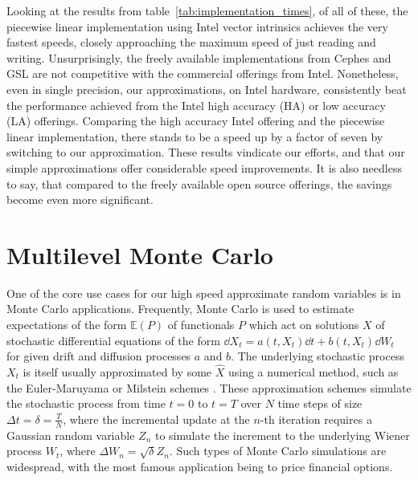 \documentclass[9pt,a4paper,english]{extarticle}
\begin{document}
Looking at the results from table~\ref{tab:implementation_times}, of all of these, the piecewise linear implementation using Intel vector intrinsics achieves the very fastest speeds, closely approaching the maximum speed of just reading and writing. Unsurprisingly, the freely available implementations from Cephes and GSL are not competitive with the commercial offerings from Intel. Nonetheless, even in single precision, our approximations, on Intel hardware, consistently beat the performance achieved from the Intel high accuracy (HA) or low accuracy (LA) offerings. Comparing the high accuracy Intel offering and the piecewise linear implementation, there stands to be a speed up by a factor of seven by switching to our approximation. These results vindicate our efforts, and that our simple approximations offer considerable speed improvements. It is also needless to say, that compared to the freely available open source offerings, the savings become even more significant. 

\section{Multilevel Monte Carlo}
\label{sec:multilevel_monte_carlo}

One of the core use cases for our high speed approximate random variables is in Monte Carlo applications. Frequently, Monte Carlo is used to estimate expectations of the form $ \mathbb{E}(P) $ of functionals $ P $ which act on solutions $ X $ of stochastic differential equations of the form $ \dd{X_t} = a(t, X_t) \dd{t} + b(t, X_t)\dd{W_t} $ for given drift and diffusion processes $ a $ and $ b $. The underlying stochastic process $ X_t $ is itself usually approximated by some $ \widehat{X} $ using a numerical method, such as the Euler-Maruyama or Milstein schemes \citep{asmussen2007stochastic,kloeden1999numerical,lord2014introduction}. These approximation schemes simulate the stochastic process from time $ t = 0 $ to $ t = T $ over $ N $ time steps of size $ \Delta t = \delta = \tfrac{T}{N} $, where the incremental update at the $ n $-th iteration requires a Gaussian random variable $ Z_n $ to simulate the increment to the underlying Wiener process $ W_t $, where $ \Delta W_n = \sqrt{\delta}Z_n $. Such types of Monte Carlo simulations are widespread, with the most famous application being to price financial options. 
\end{document}
